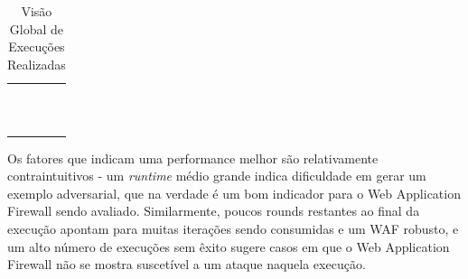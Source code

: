 \begin{table}[H]
\centering
\caption{Visão Global de Execuções Realizadas}
\begin{supertabular}{m{4.0cm}m{3.7cm}m{3.6cm}m{3.0cm}}
\hline
{} &
 &
 &
\centering{}\\\hline
{} &
 &
 &
\centering{}\\
 &
 &
 &
\centering{}\\
 &
 &
 &
\centering{}\\
 &
 &
 &
\centering{}\\
 &
 &
 &
\centering{}\\
 &
 &
 &
\centering{}\\
 &
 &
 &
\centering{}\\
 &
 &
 &
\centering{}\\
 &
 &
 &
\centering{}\\
 &
 &
 &
\centering{}\\
 &
 &
 &
\centering{}\\
\hline
\end{supertabular}
    \label{tab:tests}
\end{table}
\bigskip

Os fatores que indicam uma performance melhor são relativamente contraintuitivos - um \textit{runtime} médio grande indica dificuldade em gerar um exemplo adversarial, que na verdade é um bom indicador para o Web Application Firewall sendo avaliado. Similarmente, poucos rounds restantes ao final da execução apontam para muitas iterações sendo consumidas e um WAF robusto, e um alto número de execuções sem êxito sugere casos em que o Web Application Firewall não se mostra suscetível a um ataque naquela execução. 

